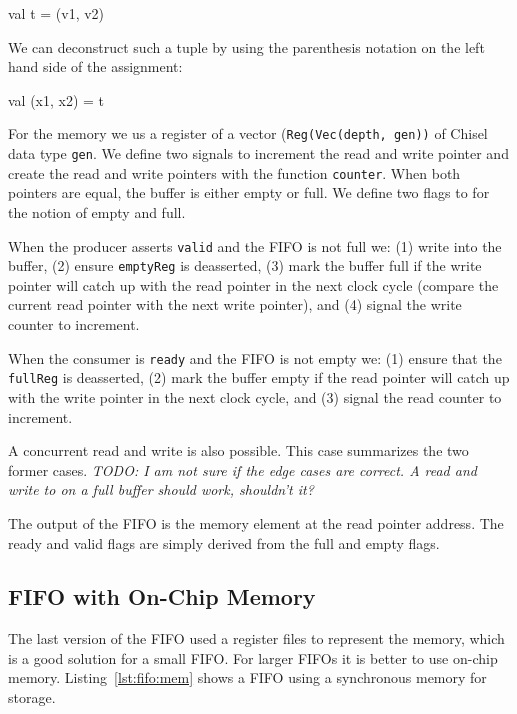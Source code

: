 \documentclass[%
    10pt,
    headinclude, footexclude,
    openright, %
    notitlepage,
    cleardoubleempty,
    headsepline,
    pointlessnumbers,
    bibtotoc, idxtotoc,
    ]{scrbook}
\newcommand{\code}[1]{{\small{\texttt{#1}}}}
\newcommand{\todo}[1]{{\emph{TODO: #1}}}
\begin{document}
\begin{chisel}
  val t = (v1, v2)
\end{chisel}

\noindent We can deconstruct such a tuple by using the parenthesis notation
on the left hand side of the assignment:

\begin{chisel}
val (x1, x2) = t
\end{chisel}

For the memory we us a register of a vector (\code{Reg(Vec(depth, gen))} of
Chisel data type \code{gen}. We define two signals to increment the read and
write pointer and create the read and write pointers with the function \code{counter}.
When both pointers are equal, the buffer is either empty or full.
We define two flags to for the notion of empty and full.

When the producer asserts \code{valid} and the FIFO is not full we:
(1) write into the buffer, (2) ensure \code{emptyReg} is deasserted,
(3) mark the buffer full if the write pointer will catch up with the read pointer
in the next clock cycle (compare the current read pointer with the next
write pointer), and (4) signal the write counter to increment.

When the consumer is \code{ready} and the FIFO is not empty we:
(1) ensure that the \code{fullReg} is deasserted, (2) mark the buffer
empty if the read pointer will catch up with the write pointer in
the next clock cycle, and (3) signal the read counter to increment.

A concurrent read and write is also possible. This case summarizes
the two former cases. \todo{I am not sure if the edge cases are correct.
A read and write to on a full buffer should work, shouldn't it?}

The output of the FIFO is the memory element at the read pointer address.
The ready and valid flags are simply derived from the full and empty
flags.

\subsection{FIFO with On-Chip Memory}

The last version of the FIFO used a register files to represent the memory,
which is a good solution for a small FIFO. For larger FIFOs it is better to
use on-chip memory.
Listing~\ref{lst:fifo:mem} shows a FIFO using a synchronous memory for
storage.

\newpage
{}
\end{document}

